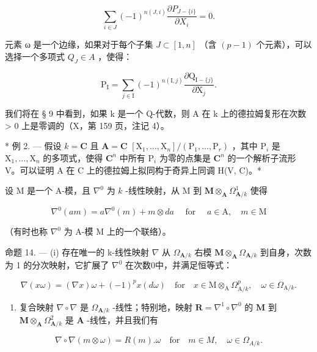 \[
\sum_ {i \in J} (- 1) ^ {n (J, i)} \frac {\partial P _ {J - \{i \}}}{\partial X _ {i}} = 0.
\]

元素 ω 是一个边缘，如果对于每个子集 \(J \subset [1, n]\) （含 \((p - 1)\) 个元素），可以选择一个多项式 \(Q_{J} \in A\) ，使得：

\[
\mathrm{P} _ {\mathrm{I}} = \sum_ {j \in \mathrm{I}} (- 1) ^ {n (\mathrm{I}, j)} \frac {\partial \mathrm{Q} _ {\mathrm{I} - \{j \}}}{\partial \mathrm{X} _ {j}}.
\]

我们将在 § 9 中看到，如果 k 是一个 Q-代数，则 A 在 k 上的德拉姆复形在次数 \textgreater{} 0 上是零调的（X，第 159 页，注记 4）。

* 例 2. --- 假设 \(k = \mathbf{C}\) 且 \(\mathbf{A} = \mathbf{C}\) \([\mathrm{X}_1, \ldots, \mathrm{X}_n] / (\mathrm{P}_1, \ldots, \mathrm{P}_r)\) ，其中 \(\mathrm{P}_i\) 是 \(\mathrm{X}_1, \ldots, \mathrm{X}_n\) 的多项式，使得 \(\mathbf{C}^n\) 中所有 \(\mathrm{P}_i\) 为零的点集是 \(\mathbf{C}^n\) 的一个解析子流形 V。可以证明 A 在 C 上的德拉姆上拟同构于奇异上同调 H(V, C)。*

设 M 是一个 A-模，且 \(\nabla^{0}\) 为 \(k\) -线性映射，从 M 到 \(\mathbf{M} \otimes_{\mathbf{A}} \Omega_{\mathbf{A}/k}^{1}\) 使得

\[
\nabla^ {0} (a m) = a \nabla^ {0} (m) + m \otimes d a \quad \text { for } \quad a \in \mathrm{A}, \quad m \in \mathrm{M}\tag{13}
\]

（有时也称 \(\nabla^{0}\) 为 A-模 M 上的一个联络）。

命题 14. --- (i) 存在唯一的 k-线性映射 \(\nabla\) 从 \(\Omega_{\mathbf{A}/k}\) 右模 \(\mathbf{M} \otimes_{\mathbf{A}} \Omega_{\mathbf{A}/k}\) 到自身，次数为 1 的分次映射，它扩展了 \(\nabla^{0}\) 在次数0中，并满足恒等式：

\[
\nabla (x \omega) = (\nabla x) \omega + (- 1) ^ {p} x (d \omega) \quad \mathrm{for} \quad x \in \mathrm{M} \otimes_ {\mathrm{A}} \Omega_ {\mathrm{A} / k} ^ {p}, \quad \omega \in \Omega_ {\mathrm{A} / k}. \tag {14}
\]

\begin{enumerate}
\def\labelenumi{(\roman{enumi})}
\setcounter{enumi}{1}
\tightlist
\item
  复合映射 \(\nabla \circ \nabla\) 是 \(\Omega_{\mathbf{A} / k}\) -线性；特别地，映射 \(\mathbf{R} = \nabla^{1} \circ \nabla^{0}\) 的 \(\mathbf{M}\) 到 \(\mathbf{M} \otimes_{\mathbf{A}} \Omega_{\mathbf{A} / k}^{2}\) 是 \(\mathbf{A}\) -线性，并且我们有
\end{enumerate}

\[
\nabla \circ \nabla (m \otimes \omega) = R (m). \omega \quad \mathrm{for} \quad m \in M, \quad \omega \in \Omega_ {A / k}.
\]

